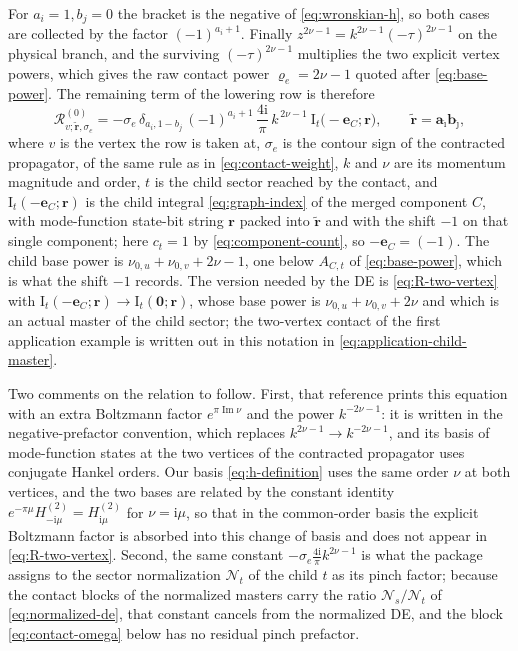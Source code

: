 \documentclass[11pt,a4paper]{article}
\newcommand{\ii}{\mathrm i}
\newcommand{\cR}{\mathcal R}
\newcommand{\cN}{\mathcal N}
\begin{document}
For $a_i=1,b_j=0$ the bracket is the negative of \eqref{eq:wronskian-h}, so both cases are
collected by the factor $(-1)^{a_i+1}$. Finally $z^{2\nu-1}=k^{2\nu-1}(-\tau)^{2\nu-1}$ on the
physical branch, and the surviving $(-\tau)^{2\nu-1}$ multiplies the two explicit vertex powers,
which gives the raw contact power $\varrho_e=2\nu-1$ quoted after \eqref{eq:base-power}. The remaining
term of the lowering row is therefore
\begin{equation}
  \cR^{(0)}_{v;\tilde{\bm r},\sigma_e}
  =-\sigma_e\,\delta_{a_i,1-b_j}\,(-1)^{a_i+1}\,\frac{4\ii}{\pi}\,
  k^{\,2\nu-1}\ \text{I}_{t}\bigl(-\bm e_C;\bm r\bigr),
  \qquad \tilde{\bm r}=\bm a_{\hat\imath}\bm b_{\hat\jmath},
  \label{eq:R-two-vertex}
\end{equation}
where $v$ is the vertex the row is taken at, $\sigma_e$ is the contour sign of the contracted
propagator, of the same rule as in \eqref{eq:contact-weight}, $k$ and $\nu$ are its momentum magnitude
and order, $t$ is the child sector
reached by the contact, and $\text{I}_{t}(-\bm e_C;\bm r)$ is the child integral
\eqref{eq:graph-index} of the merged component $C$, with mode-function state-bit string $\bm r$ packed into
$\tilde{\bm r}$ and with the shift $-1$ on that single component; here $c_t=1$ by
\eqref{eq:component-count}, so $-\bm e_C=(-1)$. The child base power is
$\nu_{0,u}+\nu_{0,v}+2\nu-1$, one below $A_{C,t}$ of \eqref{eq:base-power}, which is what the shift
$-1$ records. The version needed by the DE is \eqref{eq:R-two-vertex} with
$\text{I}_{t}(-\bm e_C;\bm r)\to\text{I}_{t}(\bm 0;\bm r)$, whose base power is
$\nu_{0,u}+\nu_{0,v}+2\nu$ and which is an actual master of the child sector; the two-vertex contact
of the first application example is written out in this notation in \eqref{eq:application-child-master}.

Two comments on the relation to \cite{Chen:2024glu} follow. First, that reference prints this
equation with an extra Boltzmann factor $e^{\pi\operatorname{Im}\nu}$ and the
power $k^{-2\nu-1}$: it is written in the negative-prefactor convention, which replaces
$k^{2\nu-1}\to k^{-2\nu-1}$, and its basis of mode-function states at the two vertices of the contracted
propagator uses conjugate Hankel orders. Our basis \eqref{eq:h-definition} uses the same order
$\nu$ at both vertices, and the two bases are related by the constant identity
$e^{-\pi\mu}H^{(2)}_{-\ii\mu}=H^{(2)}_{\ii\mu}$ for $\nu=\ii\mu$, so that in the common-order
basis the explicit Boltzmann factor is absorbed into this change of basis and does not appear
in \eqref{eq:R-two-vertex}. Second, the same constant $-\sigma_e\frac{4\ii}{\pi}k^{2\nu-1}$ is what
the package assigns to the sector normalization $\cN_t$ of the child $t$ as its pinch factor; because
the contact blocks of the normalized masters carry the ratio $\cN_s/\cN_t$ of
\eqref{eq:normalized-de}, that constant cancels from the normalized DE, and the block
\eqref{eq:contact-omega} below has no residual pinch prefactor.
\end{document}
